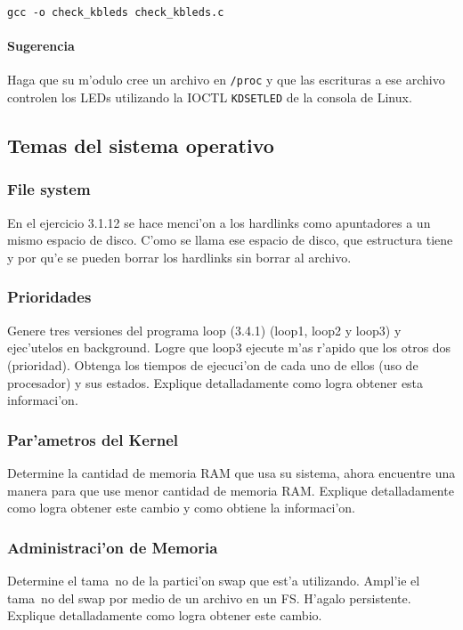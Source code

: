 \texttt{gcc -o check\_kbleds check\_kbleds.c}


\paragraph{Sugerencia}

Haga que su m'odulo cree un archivo en \texttt{/proc} y que las escrituras a ese archivo controlen los LEDs utilizando
la IOCTL \texttt{KDSETLED} de la consola de Linux.

\subsection{Temas del sistema operativo}

\subsubsection{File system}
En el ejercicio 3.1.12 se hace menci'on a los hardlinks como
apuntadores a un mismo espacio de disco. C'omo se llama ese espacio
de disco, que estructura tiene y por qu'e se pueden borrar los
hardlinks sin borrar al archivo.\\



\subsubsection{Prioridades}
Genere tres versiones del programa loop (3.4.1) (loop1, loop2 y
loop3) y ejec'utelos en background. Logre que loop3 ejecute m'as
r'apido que los otros dos (prioridad). Obtenga los tiempos de
ejecuci'on de cada uno de ellos (uso de procesador) y sus estados.
Explique detalladamente como logra obtener esta informaci'on.\\



\subsubsection{Par'ametros del Kernel}
Determine la cantidad de memoria RAM que usa su sistema, ahora
encuentre una manera para que use menor cantidad de memoria RAM.
Explique detalladamente como logra obtener este cambio y como
obtiene la informaci'on.

\subsubsection{Administraci'on de Memoria}
Determine el tama~no de la partici'on swap que est'a utilizando.
Ampl'ie el tama~no del swap por medio de un archivo en un FS.
H'agalo persistente. Explique detalladamente como logra obtener este
cambio.

